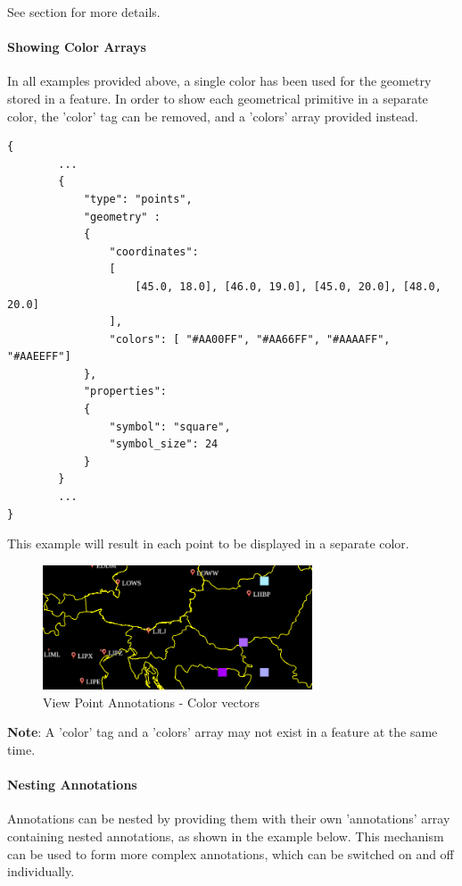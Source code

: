 See section  for more details.

\paragraph{Showing Color Arrays} In all examples provided above, a single color has been used for the geometry stored in a feature.
In order to show each geometrical primitive in a separate color, the 'color' tag can be removed, and a 'colors' array provided instead.

\begin{lstlisting}[basicstyle=\small\ttfamily]
{
        ...
        {
            "type": "points",
            "geometry" :
            {
                "coordinates": 
                [
                    [45.0, 18.0], [46.0, 19.0], [45.0, 20.0], [48.0, 20.0]
                ],
                "colors": [ "#AA00FF", "#AA66FF", "#AAAAFF", "#AAEEFF"]
            },
            "properties":
            {
                "symbol": "square",
                "symbol_size": 24
            }
        }
        ...
}
\end{lstlisting}

This example will result in each point to be displayed in a separate color.

\begin{figure}[H]
    \center
        \includegraphics[width=8cm]{figures/viewpoints_anno_example_colorvec.png}
    \caption{View Point Annotations - Color vectors} 
\end{figure}

\textbf{Note}: A 'color' tag and a 'colors' array may not exist in a feature at the same time.

\paragraph{Nesting Annotations} Annotations can be nested by providing them with their own 'annotations' array containing nested 
annotations, as shown in the example below. This mechanism can be used to form more complex annotations, which can be switched on and off 
individually.

